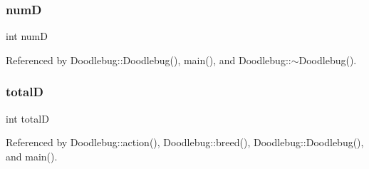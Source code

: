 \mbox{\label{Doodlebug_8cpp_ad39b4dba918aab6239d9c16f42985b99}} 
\subsubsection{numD}
{\footnotesize\ttfamily int numD}



Referenced by Doodlebug\+::\+Doodlebug(), main(), and Doodlebug\+::$\sim$\+Doodlebug().

\mbox{\label{Doodlebug_8cpp_a52d67ee50023f4c10c59bcdc88ce6957}} 
\subsubsection{totalD}
{\footnotesize\ttfamily int totalD}



Referenced by Doodlebug\+::action(), Doodlebug\+::breed(), Doodlebug\+::\+Doodlebug(), and main().

